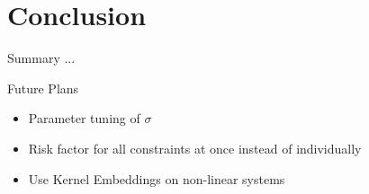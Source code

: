\documentclass[student, noshadow, lsr, english, aspectratio=169]{ITR_LSR_slides}
\begin{document}
\section{Conclusion}

\begin{frame}{Summary}
	...
\end{frame}

\begin{frame}{Future Plans}
	\begin{itemize}
	\item Parameter tuning of $\sigma$
	\item Risk factor for all constraints at once instead of individually
	\item Use Kernel Embeddings on non-linear systems
	\end{itemize}
\end{frame}

	\appendix
	\CheckAttentionSlide


\begin{frame}{\LSRITRRefTitle}
	\printbibliography
\end{frame}
\end{document}
